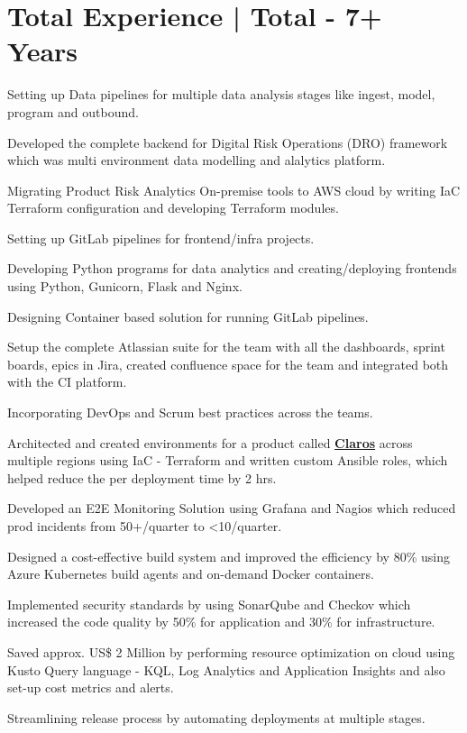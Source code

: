 \documentclass[a4paper]{deedy-resume-openfont}
\begin{document}
\section{Total Experience |  \bf\fontsize{10}{15}\selectfont Total - 7+ Years}
\begin{tightemize}
\item Setting up Data pipelines for multiple data analysis stages like ingest, model, program and outbound.
\item Developed the complete backend for Digital Risk Operations (DRO) framework which was multi environment data modelling and alalytics platform.
\item Migrating Product Risk Analytics On-premise tools to AWS cloud by writing IaC Terraform configuration and developing Terraform modules.
\item Setting up GitLab pipelines for frontend/infra projects.
\item Developing Python programs for data analytics and creating/deploying frontends using Python, Gunicorn, Flask and Nginx.
\item Designing Container based solution for running GitLab pipelines.
\item Setup the complete Atlassian suite for the team with all the dashboards, sprint boards, epics in Jira, created confluence space for the team and integrated both with the CI platform.
\item Incorporating DevOps and Scrum best practices across the teams.
\end{tightemize}
\sectionsep

\begin{tightemize}
\item Architected and created environments for a product called \href{https://www.hach.com/claros/overview#claros-video}{\bf Claros} across multiple regions using IaC - Terraform and written custom Ansible roles, which helped reduce the per deployment time by 2 hrs.
\item Developed an E2E Monitoring Solution using Grafana and Nagios which reduced prod incidents from 50+/quarter to <10/quarter.
\item Designed a cost-effective build system and improved the efficiency by 80\% using Azure Kubernetes build agents and on-demand Docker containers.
\item Implemented security standards by using SonarQube and Checkov which increased the code quality by 50\% for application and 30\% for infrastructure.
\item Saved approx. US\$ 2 Million by performing resource optimization on cloud using Kusto Query language - KQL, Log Analytics and Application Insights and also set-up cost metrics and alerts.
\item Streamlining release process by automating deployments at multiple stages.
\end{tightemize}
\sectionsep
\end{document}
